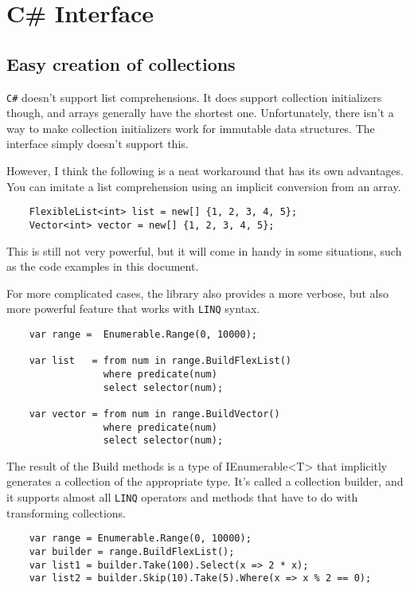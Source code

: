 \documentclass[]{article}
\newcommand{\linq}{\texttt{LINQ}\xspace}
\newcommand{\csh}{\texttt{C\#}\xspace}
\begin{document}
\section{C\# Interface}\label{sec:csharp}




\subsection{Easy creation of collections}\label{sec:csh-easy}
\csh doesn't support list comprehensions. It does support collection initializers though, and arrays generally have the shortest one. Unfortunately, there isn't a way to make collection initializers work for immutable data structures. The interface simply doesn't support this. 

However, I think the following is a neat workaround that has its own advantages. You can imitate a list comprehension using an implicit conversion from an array.

\begin{lstlisting}
	FlexibleList<int> list = new[] {1, 2, 3, 4, 5};
	Vector<int> vector = new[] {1, 2, 3, 4, 5};
\end{lstlisting}

This is still not very powerful, but it will come in handy in some situations, such as the code examples in this document.

For more complicated cases, the library also provides a more verbose, but also more powerful feature that works with \linq syntax. 
\begin{lstlisting}
	var range =  Enumerable.Range(0, 10000);
	
	var list   = from num in range.BuildFlexList()
				 where predicate(num) 
				 select selector(num);
				 
	var vector = from num in range.BuildVector()
				 where predicate(num)
				 select selector(num);
\end{lstlisting}

The result of the Build methods is a type of IEnumerable<T> that implicitly generates a collection of the appropriate type. It's called a collection builder, and it supports almost all \linq operators and methods that have to do with transforming collections.

\begin{lstlisting}
	var range = Enumerable.Range(0, 10000);
	var builder = range.BuildFlexList();
	var list1 = builder.Take(100).Select(x => 2 * x);
	var list2 = builder.Skip(10).Take(5).Where(x => x % 2 == 0);

\end{lstlisting}
\end{document}
